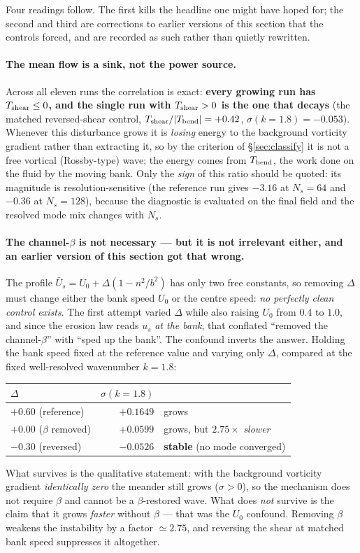 \documentclass[11pt]{article}
\newcommand{\us}{u_s}
\newcommand{\Us}{\bar U_s}
\begin{document}
Four readings follow. The first kills the headline one might have hoped for; the second
and third are corrections to earlier versions of this section that the controls forced,
and are recorded as such rather than quietly rewritten.

\paragraph{The mean flow is a sink, not the power source.} Across all eleven runs the
correlation is exact: \textbf{every growing run has $T_{\rm shear}\le0$, and the single
run with $T_{\rm shear}>0$ is the one that decays} (the matched reversed-shear control,
$T_{\rm shear}/|T_{\rm bend}|=+0.42$, $\sigma(k{=}1.8)=-0.053$). Whenever this
disturbance grows it is \emph{losing} energy to the background vorticity gradient rather
than extracting it, so by the criterion of \S\ref{sec:classify} it is not a free vortical
(Rossby-type) wave; the energy comes from $T_{\rm bend}$, the work done on the fluid by
the moving bank. Only the \emph{sign} of this ratio should be quoted: its magnitude is
resolution-sensitive (the reference run gives $-3.16$ at $N_s=64$ and $-0.36$ at
$N_s=128$), because the diagnostic is evaluated on the final field and the resolved mode
mix changes with $N_s$.

\paragraph{The channel-$\beta$ is not necessary --- but it is not irrelevant either,
and an earlier version of this section got that wrong.} The profile
$\Us=U_0+\Delta(1-n^2/b^2)$ has only two free constants, so removing $\Delta$ must
change either the bank speed $U_0$ or the centre speed: \emph{no perfectly clean control
exists}. The first attempt varied $\Delta$ while also raising $U_0$ from $0.4$ to $1.0$,
and since the erosion law reads $\us$ \emph{at the bank}, that conflated ``removed the
channel-$\beta$'' with ``sped up the bank''. The confound inverts the answer. Holding
the bank speed fixed at the reference value and varying only $\Delta$, compared at the
fixed well-resolved wavenumber $k=1.8$:
\begin{center}
\begin{tabular}{lrl}
\hline
$\Delta$ & $\sigma(k{=}1.8)$ & \\
\hline
$+0.60$ (reference) & $+0.1649$ & grows\\
$+0.00$ ($\beta$ removed) & $+0.0599$ & grows, but $2.75\times$ \emph{slower}\\
$-0.30$ (reversed) & $-0.0526$ & \textbf{stable} (no mode converged)\\
\hline
\end{tabular}
\end{center}
What survives is the qualitative statement: with the background vorticity gradient
\emph{identically zero} the meander still grows ($\sigma>0$), so the mechanism does not
require $\beta$ and cannot be a $\beta$-restored wave. What does \emph{not} survive is
the claim that it grows \emph{faster} without $\beta$ --- that was the $U_0$ confound.
Removing $\beta$ weakens the instability by a factor $\simeq2.75$, and reversing the
shear at matched bank speed suppresses it altogether.
\end{document}
